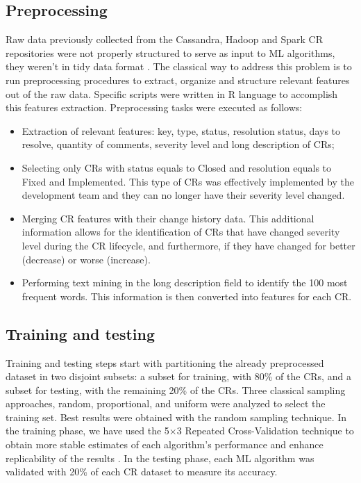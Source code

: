 \subsection{Preprocessing} 	\label{subsec:preprocessing}

Raw data previously collected from the Cassandra, Hadoop and Spark CR repositories were not properly structured to serve as input to ML algorithms, they weren't in tidy data format \cite{DeJonge2013}. The classical way to address this problem is to run preprocessing procedures to extract, organize and structure relevant features out of the raw data. Specific scripts were written in R language to accomplish this features extraction. Preprocessing tasks were executed as follows:  

\begin{itemize}
 \item Extraction of relevant features: key, type, status, resolution status, days to resolve, quantity of comments, severity level and long description of CRs; 
 \item Selecting only CRs with status equals to Closed and resolution equals to Fixed and Implemented. This type of CRs was effectively implemented by the development team and they can no longer have their severity level changed.
 \item Merging CR features with their change history data. This additional information allows for the identification of CRs that have changed severity level during the CR lifecycle, and furthermore, if they have changed for better (decrease) or worse (increase).
 \item Performing text mining in the long description field to identify the 100 most frequent words. This information is then converted into features for each CR.
\end{itemize}

\subsection{Training and testing}  	\label{subsec:training}

Training and testing steps start with partitioning the already preprocessed dataset in two disjoint subsets: a subset for training, with 80\% of the CRs, and a subset for testing, with the remaining 20\% of the CRs. Three classical sampling approaches, random, proportional, and uniform\cite{Japkowicz:2011} were analyzed to select the training set. Best results were obtained with the random sampling technique. In the training phase, we have used the 5$\times$3 Repeated Cross-Validation technique \cite{Zhao2013} to obtain more stable estimates of each algorithm's performance and enhance replicability of the results \cite{Japkowicz:2011}. In the testing phase, each ML algorithm was validated with 20\% of each CR dataset to measure its accuracy.
 
